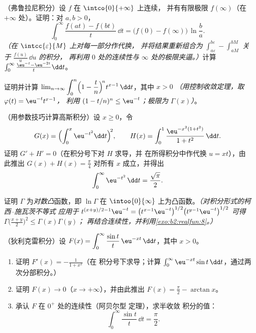 \begin{exercise}[$\star\star$]\label{exo:b2:integration:6}
（弗鲁拉尼积分）设 $f$ 在 $\intco{0}{+\infty}$ 上连续，
并有有限极限 $f(\infty)$（在 $+\infty$ 处）。证明：对 $a, b > 0$，
\[
\int_0^{\infty} \frac{f(at) - f(bt)}{t}\,\dd t
= \bigl(f(0) - f(\infty)\bigr)\,\ln\frac ba .
\]
\emph{（在 $\intcc{\varepsilon}{M}$ 上对每一部分作代换，
并将结果重新组合为 $\int_{a\varepsilon}^{b\varepsilon} -
\int_{aM}^{bM}$ 关于 $\frac{f(u)}u\,\dd u$ 的积分，
再利用 $0$ 处的连续性与 $\infty$ 处的极限夹逼。）}计算
$\int_0^\infty \frac{\eu^{-t} - \eu^{-2t}}{t}\dd t$。
\end{exercise}

\begin{exercise}[$\star\star$]\label{exo:b2:integration:7}
证明并计算 $\lim_{n\to\infty} \displaystyle\int_0^n
\Bigl(1 - \frac tn\Bigr)^{\!n} t^{x-1}\,\dd t$，其中 $x > 0$
\emph{（用控制收敛定理，取 $\varphi(t) = \eu^{-t}t^{x-1}$，
利用 $(1 - t/n)^n \leq \eu^{-t}$；极限为 $\Gamma(x)$）}。
\end{exercise}

\begin{exercise}[$\star\star\star$]\label{exo:b2:integration:8}
（用参数技巧计算高斯积分）设 $x \geq 0$，令
\[
G(x) = \Bigl(\int_0^x \eu^{-t^2}\dd t\Bigr)^{\!2},
\qquad
H(x) = \int_0^1 \frac{\eu^{-x^2(1+t^2)}}{1 + t^2}\,\dd t .
\]
证明 $G' + H' = 0$（在积分号下对 $H$ 求导，并
在所得积分中作代换 $u = xt$），由此推出 $G(x) + H(x)
= \frac\pi4$ 对所有 $x$ 成立，并得出
\[
\int_0^{\infty} \eu^{-t^2}\,\dd t = \frac{\sqrt\pi}{2} .
\]
\end{exercise}

\begin{exercise}[$\star\star\star$]\label{exo:b2:integration:9}
证明 $\Gamma$ 为\emph{对数凸}函数，即 $\ln\Gamma$ 在
$\intoo{0}{\infty}$ 上为凸函数。\emph{（对积分形式的柯西--施瓦茨不等式
应用于 $t^{(x+y)/2 - 1}\eu^{-t} = \bigl(t^{x-1}\eu^{-t}\bigr)^{1/2}
\bigl(t^{y-1}\eu^{-t}\bigr)^{1/2}$ 可得
$\Gamma\bigl(\frac{x+y}{2}\bigr)^2 \leq \Gamma(x)\Gamma(y)$；
再结合连续性，并利用\cref{exo:b2:realfun:8}。）}
\end{exercise}

\begin{exercise}[$\star\star\star$]\label{exo:b2:integration:10}
（狄利克雷积分）设 $F(x) = \displaystyle\int_0^{\infty}
\frac{\sin t}{t}\,\eu^{-xt}\,\dd t$，其中 $x > 0$。
\begin{enumerate}
  \item 证明 $F'(x) = -\frac{1}{1 + x^2}$（在
        积分号下求导；计算 $\int_0^\infty \eu^{-xt}\sin t\,\dd
        t$，通过两次分部积分。）
  \item 证明 $F(x) \to 0$（$x \to +\infty$），并由此推出 $F(x) =
        \frac\pi2 - \arctan x$。
  \item 承认 $F$ 在 $0^+$ 处的连续性（阿贝尔型
        定理），求半收敛
        积分的值：
        \[
        \int_0^{\infty} \frac{\sin t}{t}\,\dd t = \frac{\pi}{2}.
        \]
\end{enumerate}
\end{exercise}

